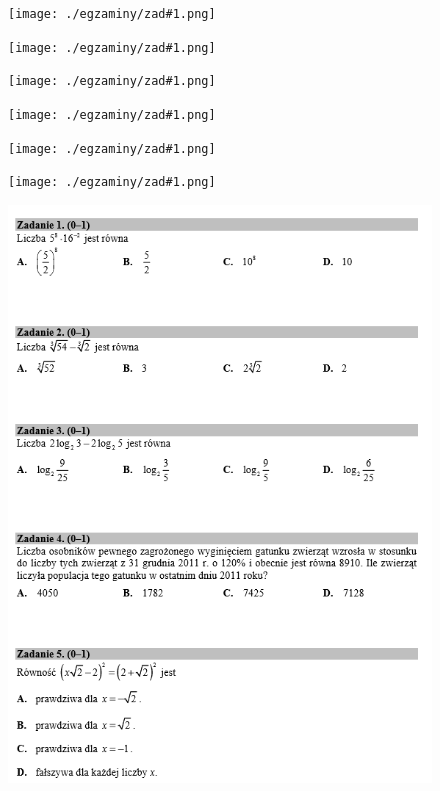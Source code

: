 \documentclass[11pt]{article}
\theoremstyle{definition}
\numberwithin{zad}{section}
\begin{document}



\renewcommand\cke[1]{

\begin{figure}
\centering
\texttt{[image: ./egzaminy/zad\#1.png]}
\end{figure}

}

\cke{17}
\cke{18}
\cke{19}
\cke{20}
\cke{21}
\cke{22}

\begin{figure}
\centering
\includegraphics[width=0.7\linewidth]{./egzaminy/mat1.png}
\end{figure}
\end{document}
